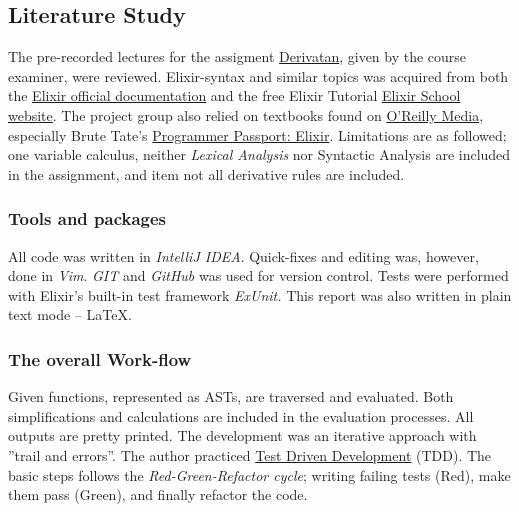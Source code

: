 \documentclass[a4paper,11pt]{article}
\begin{document}
\subsection*{Literature Study}
\label{subsec:methods}
The pre-recorded lectures for the assigment
\href{https://canvas.kth.se/courses/44911/assignments/275580}{Derivatan},
given by the course examiner, were reviewed.
Elixir-syntax and similar topics was acquired
from both the
\href{https://elixir-lang.org/docs.html}{Elixir official documentation}
and the free Elixir Tutorial
\href{https://elixirschool.com/en}{Elixir School
website}.
The project group also relied on textbooks found on
\href{https://learning.oreilly.com}{O'Reilly Media},
especially Brute Tate's
\href{https://learning.oreilly.com/library/view/programmer-passport-elixir/9781680509649/}{Programmer Passport: Elixir}.
Limitations are as followed; one variable calculus,
neither \emph{Lexical Analysis} nor {Syntactic Analysis} are included in the assignment, and
item not all derivative rules are included.

\subsubsection*{Tools and packages}
\label{subsec:tools}
All code was written in \emph{IntelliJ IDEA}.
Quick-fixes and editing was, however, done in \emph{Vim}. 
\emph{GIT} and \emph{GitHub} was used for version control.
Tests were performed with Elixir's built-in test framework \emph{ExUnit.}
This report was also written in plain text mode -- \LaTeX.

\subsubsection*{The overall Work-flow} %
\label{subsec:workflow}
Given functions, represented as ASTs, are traversed and evaluated.
Both simplifications and calculations are included in the evaluation processes.
All outputs are pretty printed.
The development was an iterative approach with ''trail and errors''.
The author practiced
\href{https://www.elixirwiki.com/wiki/Test-Driven_Development_in_Elixir}{Test Driven Development}
(TDD).
The basic steps follows the \emph{Red-Green-Refactor cycle}; writing failing tests (Red), make them pass (Green),
and finally refactor the code.
\end{document}
